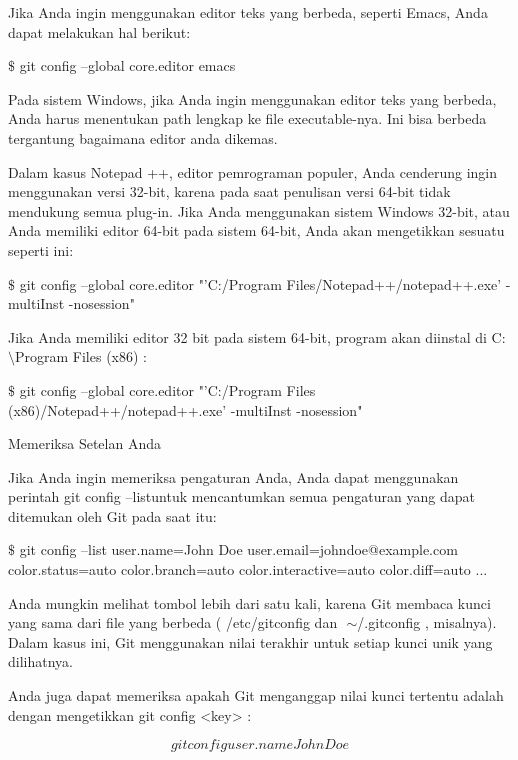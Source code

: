 \vspace{12pt}
\noindent 
Jika Anda ingin menggunakan editor teks yang berbeda, seperti Emacs, Anda dapat melakukan hal berikut: \par
\vspace{12pt}
\noindent 
  $  \$  $ git config --global core.editor emacs  \par
\vspace{12pt}
\noindent 
Pada sistem Windows, jika Anda ingin menggunakan editor teks yang berbeda, Anda harus menentukan path lengkap ke file executable-nya. $  $Ini bisa berbeda tergantung bagaimana editor anda dikemas. \par
\vspace{12pt}
\noindent 
Dalam kasus Notepad ++, editor pemrograman populer, Anda cenderung ingin menggunakan versi 32-bit, karena pada saat penulisan versi 64-bit tidak mendukung semua plug-in. $  $Jika Anda menggunakan sistem Windows 32-bit, atau Anda memiliki editor 64-bit pada sistem 64-bit, Anda akan mengetikkan sesuatu seperti ini: \par
\vspace{12pt}
\noindent 
  $  \$  $ git config --global core.editor "'C:/Program Files/Notepad++/notepad++.exe' -multiInst -nosession"  \par
\vspace{12pt}
\noindent 
Jika Anda memiliki editor 32 bit pada sistem 64-bit, program akan diinstal di $  $C: $  \setminus  $Program Files (x86) $  $: \par
\vspace{12pt}
\noindent 
  $  \$  $ git config --global core.editor "'C:/Program Files (x86)/Notepad++/notepad++.exe' -multiInst -nosession"  \par
\noindent 
Memeriksa Setelan Anda \par
\vspace{12pt}
\noindent 
Jika Anda ingin memeriksa pengaturan Anda, Anda dapat menggunakan perintah $  $git config --listuntuk mencantumkan semua pengaturan yang dapat ditemukan oleh Git pada saat itu: \par
\vspace{12pt}
\noindent 
  $  \$  $ git config --list user.name=John Doe user.email=johndoe@example.com color.status=auto color.branch=auto color.interactive=auto color.diff=auto ...  \par
\vspace{12pt}
\noindent 
Anda mungkin melihat tombol lebih dari satu kali, karena Git membaca kunci yang sama dari file yang berbeda ( $  $/etc/gitconfig $  $dan $  $ $  \sim  $/.gitconfig $  $, misalnya). $  $Dalam kasus ini, Git menggunakan nilai terakhir untuk setiap kunci unik yang dilihatnya. \par
\vspace{12pt}
\noindent 
Anda juga dapat memeriksa apakah Git menganggap nilai kunci tertentu adalah dengan mengetikkan $  $git config <key> $  $: \par
\vspace{12pt}
\noindent 
\begin{equation}
git config user.name John Doe 
\end{equation}
\vspace{12pt}
\vspace{12pt}
\vspace{12pt}


